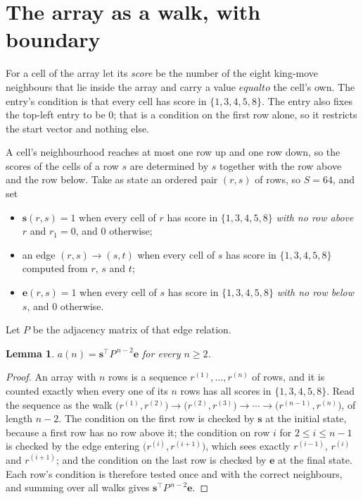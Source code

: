 \documentclass[11pt,a4paper]{article}
\theoremstyle{plain}
\newtheorem{lemma}[theorem]{Lemma}
\theoremstyle{definition}
\begin{document}
\section{The array as a walk, with boundary}

For a cell of the array let its \emph{score} be the number of the eight king-move neighbours that lie inside
the array and carry a value $equal to$ the cell's own. The entry's condition is that every cell
has score in $\{1,3,4,5,8\}$. The entry also fixes the top-left entry to be $0$; that is a condition on the first row alone, so it restricts the start vector and nothing else.

A cell's neighbourhood reaches at most one row up and one row down, so the scores of the
cells of a row $s$ are determined by $s$ together with the row above and the row below.
Take as state an ordered pair $(r,s)$ of rows, so $S=64$, and set
\begin{itemize}
\item $\mathbf{s}(r,s)=1$ when every cell of $r$ has score in $\{1,3,4,5,8\}$ \emph{with no row
above $r$} and $r_1=0$, and $0$ otherwise;
\item an edge $(r,s)\to(s,t)$ when every cell of $s$ has score in $\{1,3,4,5,8\}$ computed from
$r$, $s$ and $t$;
\item $\mathbf{e}(r,s)=1$ when every cell of $s$ has score in $\{1,3,4,5,8\}$ \emph{with no row
below $s$}, and $0$ otherwise.
\end{itemize}
Let $P$ be the adjacency matrix of that edge relation.

\begin{lemma}\label{lem:walk}
$a(n)=\mathbf{s}^{\!\top}P^{\,n-2}\mathbf{e}$ for every $n\ge2$.
\end{lemma}

\begin{proof}
An array with $n$ rows is a sequence $r^{(1)},\dots,r^{(n)}$ of rows, and it is counted
exactly when every one of its $n$ rows has all scores in $\{1,3,4,5,8\}$. Read the sequence as the
walk $\bigl(r^{(1)},r^{(2)}\bigr)\to\bigl(r^{(2)},r^{(3)}\bigr)\to\cdots\to
\bigl(r^{(n-1)},r^{(n)}\bigr)$, of length $n-2$. The condition on the first row is
checked by $\mathbf{s}$ at the initial state, because a first row has no row above it; the
condition on row $i$ for $2\le i\le n-1$ is checked by the edge entering
$\bigl(r^{(i)},r^{(i+1)}\bigr)$, which sees exactly $r^{(i-1)}$, $r^{(i)}$ and
$r^{(i+1)}$; and the condition on the last row is checked by $\mathbf{e}$ at the final
state. Each row's condition is therefore tested once and with the correct neighbours, and
summing over all walks gives $\mathbf{s}^{\!\top}P^{\,n-2}\mathbf{e}$.
\end{proof}
\end{document}
